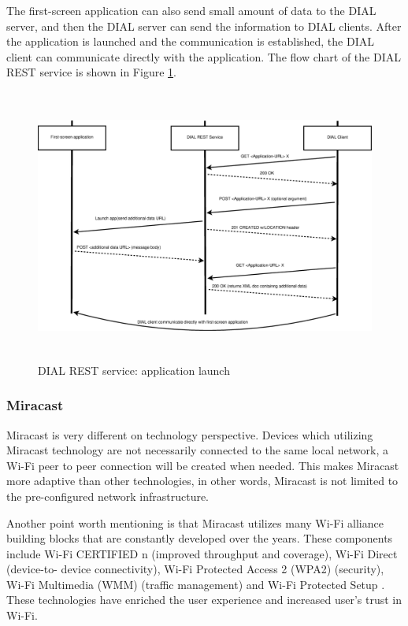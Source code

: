The first-screen application can also send small amount of data to the DIAL 
server, and then the DIAL server can send the information to DIAL clients. 
After the application is launched and the communication is established, the DIAL 
client can communicate directly with the application. The flow chart of  the
DIAL REST service is  shown in Figure \ref{dial_rest}.
\begin{figure}[htb] \centering \includegraphics[height=9cm]{charts/dial_rest} 
\caption{DIAL REST service: application launch \label{dial_rest}} 
\end{figure} 

\subsubsection{Miracast\label{2_2_5}} %
Miracast \cite{miracast_industry} is very different on technology perspective.
Devices which utilizing Miracast technology are not necessarily connected to
the same local network, a Wi-Fi peer to peer connection will be created when
needed. This makes Miracast more adaptive than other technologies, in other
words, Miracast is not limited to the pre-configured network infrastructure.

Another point worth mentioning is that Miracast utilizes many Wi-Fi alliance
building blocks that are constantly developed over the years. These components
include Wi-Fi CERTIFIED n (improved throughput and coverage), Wi-Fi Direct
(device-to- device connectivity), Wi-Fi Protected Access 2 (WPA2) (security),
Wi-Fi Multimedia (WMM) (traffic management) and Wi-Fi Protected
Setup \cite{miracast_industry}. These technologies have enriched the user
experience and increased user's trust in Wi-Fi.

